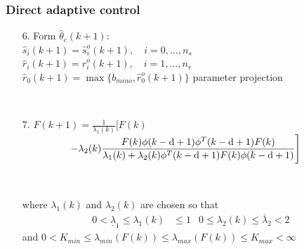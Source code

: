 \begin{frame}
    \frametitle{Direct adaptive control}

    \begin{enumerate}
        \item[6.]
        Form $\hat{\theta}_c(k+1)$: \\
        $\hat{s}_i(k+1) = \hat{s}_i^o(k+1), \quad i = 0,\ldots,n_s$ \\
        $\hat{r}_i(k+1) = \hat{r}_i^o(k+1), \quad i = 1,\ldots,n_r$ \\
        $\hat{r}_0(k+1) = \max \{ b_{mino}, \hat{r}_0^o(k+1) \}$ \hfill parameter projection

        $ \ $

        \item[7.]
        $\displaystyle F(k+1) = \frac{1}{\lambda_1(k)} \Bigg[ F(k)$ \\
        $\displaystyle \hspace{1.7cm} -\lambda_2(k) \frac{ F(k) \phi(k-\textrm{d}+1) \phi^T(k-\textrm{d}+1) F(k) } {\lambda_1(k) + \lambda_2(k) \phi^T(k-\textrm{d}+1) F(k) \phi(k-\textrm{d}+1) } \Bigg]$

        $ \ $

        where $\lambda_1(k)$ and $\lambda_2(k)$ are chosen so that
        \begin{align*}
            0 < \underline{\lambda}_1 \leq \lambda_1(k) & \leq 1
                & 0 \leq \lambda_2(k) \leq \overline{\lambda}_2 < 2
        \end{align*}
        and $0 < K_{min} \leq \lambda_{min}(F(k)) \leq \lambda_{max}(F(k)) \leq K_{max} < \infty$

    \end{enumerate}
\end{frame}

